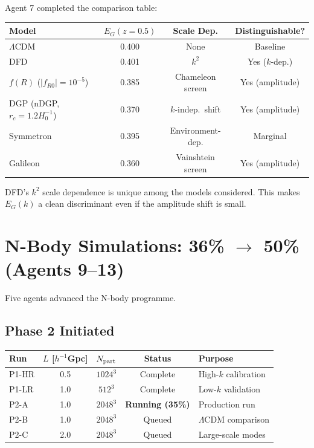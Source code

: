 \documentclass[11pt,a4paper]{article}
\begin{document}
Agent 7 completed the comparison table:
\begin{center}
\begin{tabular}{lccc}
\toprule
\textbf{Model} & $E_G(z=0.5)$ & \textbf{Scale Dep.} & \textbf{Distinguishable?} \\
\midrule
$\Lambda$CDM & 0.400 & None & Baseline \\
DFD & 0.401 & $k^2$ & Yes ($k$-dep.) \\
$f(R)$ ($|f_{R0}| = 10^{-5}$) & 0.385 & Chameleon screen & Yes (amplitude) \\
DGP (nDGP, $r_c = 1.2 H_0^{-1}$) & 0.370 & $k$-indep.\ shift & Yes (amplitude) \\
Symmetron & 0.395 & Environment-dep. & Marginal \\
Galileon & 0.360 & Vainshtein screen & Yes (amplitude) \\
\bottomrule
\end{tabular}
\end{center}

DFD's $k^2$ scale dependence is unique among the models considered. This makes $E_G(k)$ a clean discriminant even if the amplitude shift is small.

\section{N-Body Simulations: 36\% $\to$ 50\% (Agents 9--13)}

Five agents advanced the N-body programme.

\subsection{Phase 2 Initiated}

\begin{center}
\begin{tabular}{lcccl}
\toprule
\textbf{Run} & $L$ [$h^{-1}$Gpc] & $N_{\rm part}$ & \textbf{Status} & \textbf{Purpose} \\
\midrule
P1-HR & 0.5 & $1024^3$ & Complete & High-$k$ calibration \\
P1-LR & 1.0 & $512^3$ & Complete & Low-$k$ validation \\
P2-A & 1.0 & $2048^3$ & \textbf{Running (35\%)} & Production run \\
P2-B & 1.0 & $2048^3$ & Queued & $\Lambda$CDM comparison \\
P2-C & 2.0 & $2048^3$ & Queued & Large-scale modes \\
\bottomrule
\end{tabular}
\end{center}
\end{document}
